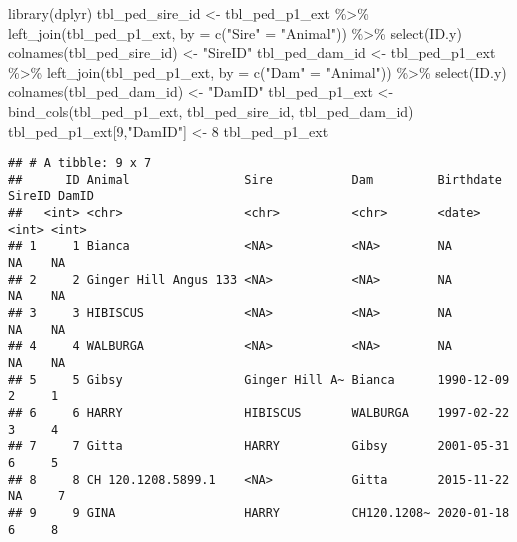 \documentclass[
]{article}
\newenvironment{Shaded}{\begin{snugshade}}{\end{snugshade}}
\newcommand{\AttributeTok}[1]{\textcolor[rgb]{0.77,0.63,0.00}{#1}}
\newcommand{\DecValTok}[1]{\textcolor[rgb]{0.00,0.00,0.81}{#1}}
\newcommand{\FunctionTok}[1]{\textcolor[rgb]{0.00,0.00,0.00}{#1}}
\newcommand{\NormalTok}[1]{#1}
\newcommand{\OtherTok}[1]{\textcolor[rgb]{0.56,0.35,0.01}{#1}}
\newcommand{\SpecialCharTok}[1]{\textcolor[rgb]{0.00,0.00,0.00}{#1}}
\newcommand{\StringTok}[1]{\textcolor[rgb]{0.31,0.60,0.02}{#1}}
\begin{document}
\begin{Shaded}
\begin{Highlighting}[]
\FunctionTok{library}\NormalTok{(dplyr)}
\NormalTok{tbl\_ped\_sire\_id }\OtherTok{\textless{}{-}}\NormalTok{ tbl\_ped\_p1\_ext }\SpecialCharTok{\%\textgreater{}\%} 
  \FunctionTok{left\_join}\NormalTok{(tbl\_ped\_p1\_ext, }\AttributeTok{by =} \FunctionTok{c}\NormalTok{(}\StringTok{"Sire"} \OtherTok{=} \StringTok{"Animal"}\NormalTok{)) }\SpecialCharTok{\%\textgreater{}\%} 
  \FunctionTok{select}\NormalTok{(ID.y)}
\FunctionTok{colnames}\NormalTok{(tbl\_ped\_sire\_id) }\OtherTok{\textless{}{-}} \StringTok{"SireID"}
\NormalTok{tbl\_ped\_dam\_id }\OtherTok{\textless{}{-}}\NormalTok{ tbl\_ped\_p1\_ext }\SpecialCharTok{\%\textgreater{}\%} 
  \FunctionTok{left\_join}\NormalTok{(tbl\_ped\_p1\_ext, }\AttributeTok{by =} \FunctionTok{c}\NormalTok{(}\StringTok{"Dam"} \OtherTok{=} \StringTok{"Animal"}\NormalTok{)) }\SpecialCharTok{\%\textgreater{}\%} 
  \FunctionTok{select}\NormalTok{(ID.y)}
\FunctionTok{colnames}\NormalTok{(tbl\_ped\_dam\_id) }\OtherTok{\textless{}{-}} \StringTok{"DamID"}
\NormalTok{tbl\_ped\_p1\_ext }\OtherTok{\textless{}{-}} \FunctionTok{bind\_cols}\NormalTok{(tbl\_ped\_p1\_ext, tbl\_ped\_sire\_id, tbl\_ped\_dam\_id)}
\NormalTok{tbl\_ped\_p1\_ext[}\DecValTok{9}\NormalTok{,}\StringTok{"DamID"}\NormalTok{] }\OtherTok{\textless{}{-}} \DecValTok{8}
\NormalTok{tbl\_ped\_p1\_ext}
\end{Highlighting}
\end{Shaded}

\begin{verbatim}
## # A tibble: 9 x 7
##      ID Animal                Sire           Dam         Birthdate  SireID DamID
##   <int> <chr>                 <chr>          <chr>       <date>      <int> <int>
## 1     1 Bianca                <NA>           <NA>        NA             NA    NA
## 2     2 Ginger Hill Angus 133 <NA>           <NA>        NA             NA    NA
## 3     3 HIBISCUS              <NA>           <NA>        NA             NA    NA
## 4     4 WALBURGA              <NA>           <NA>        NA             NA    NA
## 5     5 Gibsy                 Ginger Hill A~ Bianca      1990-12-09      2     1
## 6     6 HARRY                 HIBISCUS       WALBURGA    1997-02-22      3     4
## 7     7 Gitta                 HARRY          Gibsy       2001-05-31      6     5
## 8     8 CH 120.1208.5899.1    <NA>           Gitta       2015-11-22     NA     7
## 9     9 GINA                  HARRY          CH120.1208~ 2020-01-18      6     8
\end{verbatim}
\end{document}

